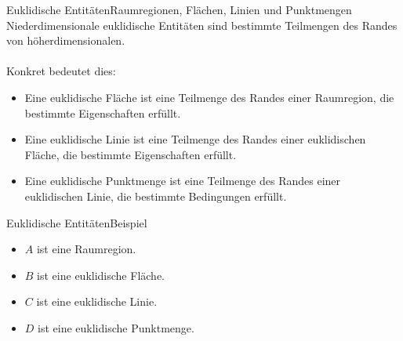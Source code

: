 \documentclass[10pt,xcolor={dvipsnames}]{beamer}
\begin{document}
\begin{frame}{Euklidische Entitäten}{Raumregionen, Flächen, Linien und Punktmengen}
    Niederdimensionale euklidische Entitäten sind bestimmte Teilmengen des Randes von höherdimensionalen.\\ \ \\
    Konkret bedeutet dies:
        \begin{itemize}
        \item Eine euklidische Fläche ist eine Teilmenge des Randes einer Raumregion, die bestimmte Eigenschaften erfüllt.
        \item Eine euklidische Linie ist eine Teilmenge des Randes einer euklidischen Fläche, die bestimmte Eigenschaften erfüllt.
        \item Eine euklidische Punktmenge ist eine Teilmenge des Randes einer euklidischen Linie, die bestimmte Bedingungen erfüllt.
      \end{itemize}
\end{frame}




\begin{frame}{Euklidische Entitäten}{Beispiel}
    \begin{itemize}
        \item $A$ ist eine Raumregion.
        \item $B$ ist eine euklidische Fläche.
        \item $C$ ist eine euklidische Linie.
        \item $D$ ist eine euklidische Punktmenge.
    \end{itemize}
\end{frame}
\end{document}
